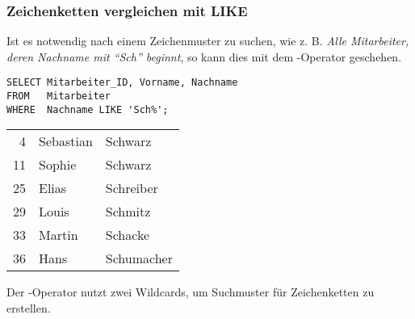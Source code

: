         \subsubsection{Zeichenketten vergleichen mit LIKE}
          Ist es notwendig nach einem Zeichenmuster zu suchen, wie z. B. \textit{Alle Mitarbeiter, deren Nachname mit \enquote{Sch} beginnt}, so kann dies mit dem -Operator geschehen.
          \begin{lstlisting}[language=oracle_sql,caption={Zeichenkettensuche mit einem Suchmuster},label=sql02_08]
SELECT Mitarbeiter_ID, Vorname, Nachname
FROM   Mitarbeiter
WHERE  Nachname LIKE 'Sch%';
          \end{lstlisting}
          \begin{center}
            \begin{small}
              \tablehead{}
              \tabletail{
              }
              \begin{msoraclesql}
                \begin{supertabular}{rll}
                  4 & Sebastian & Schwarz \\
                  11 & Sophie & Schwarz \\
                  25 & Elias & Schreiber \\
                  29 & Louis & Schmitz \\
                  33 & Martin & Schacke \\
                  36 & Hans & Schumacher \\
                \end{supertabular}
              \end{msoraclesql}
            \end{small}
          \end{center}
          Der -Operator nutzt zwei Wildcards, um Suchmuster für Zeichenketten zu erstellen.
